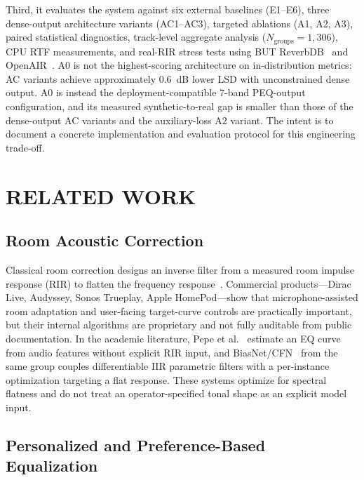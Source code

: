 \documentclass{aes2e}
\begin{document}
Third, it evaluates the system against six external baselines (E1--E6),
three dense-output architecture variants (AC1--AC3), targeted ablations
(A1, A2, A3), paired statistical diagnostics, track-level aggregate analysis
($N_\text{groups} = 1{,}306$), CPU RTF measurements, and real-RIR stress
tests using BUT ReverbDB~\cite{szoke2019} and OpenAIR~\cite{openair2010}.
A0 is not the highest-scoring architecture on in-distribution metrics:
AC variants achieve approximately 0.6~dB lower LSD with unconstrained
dense output. A0 is instead the deployment-compatible 7-band PEQ-output
configuration, and its measured synthetic-to-real gap is smaller than
those of the dense-output AC variants and the auxiliary-loss A2 variant.
The intent is to document a concrete implementation and evaluation
protocol for this engineering trade-off.

\section{RELATED WORK}
\label{sec:related}

\subsection{Room Acoustic Correction}

Classical room correction designs an inverse filter from a measured
room impulse response (RIR) to flatten the frequency
response~\cite{miyoshi1988}. Commercial products---Dirac Live,
Audyssey, Sonos Trueplay, Apple HomePod---show that microphone-assisted
room adaptation and user-facing target-curve controls are practically
important, but their internal algorithms are proprietary and not fully
auditable from public documentation.
In the academic literature, Pepe et al.~\cite{pepe2020} estimate an EQ
curve from audio features without explicit RIR input, and
BiasNet/CFN~\cite{pepe2022} from the same group couples differentiable
IIR parametric filters with a per-instance optimization targeting a flat
response. These systems optimize for spectral flatness and do not treat
an operator-specified tonal shape as an explicit model input.

\subsection{Personalized and Preference-Based Equalization}
\end{document}
